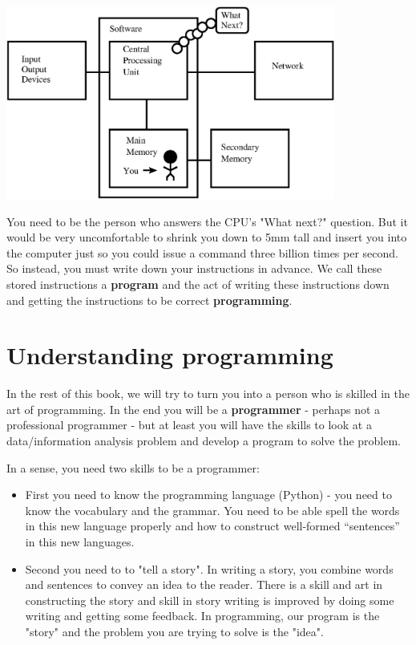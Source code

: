 \documentclass[10pt]{book}
\begin{document}
\beforefig
\centerline{\includegraphics[height=2.50in]{figs2/arch2.eps}}
\afterfig

You need to be the person who answers the CPU's "What next?" 
question.  But it would be very uncomfortable to shrink you 
down to 5mm tall and insert you into the computer just so you 
could issue a command three billion times per second.  So instead,
you must write down your instructions in advance.
We call these stored instructions a {\bf program} and the act 
of writing these instructions down and getting the instructions to 
be correct {\bf programming}.

\section{Understanding programming}

In the rest of this book, we will try to turn you into a person
who is skilled in the art of programming.  In the end you will be a 
{\bf programmer} - perhaps not a professional programmer - but 
at least you will have the skills to look at a data/information
analysis problem and develop a program to solve the problem.


In a sense, you need two skills to be a programmer:

\begin{itemize}

\item First you need to know the programming language (Python) -
you need to know the vocabulary and the grammar.  You need to be able 
spell the words in this new language properly and how to construct 
well-formed ``sentences'' in this new languages.

\item Second you need to to "tell a story".  In writing a story,
you combine words and sentences to convey an idea to the reader. 
There is a skill and art in constructing the story and skill in
story writing is improved by doing some writing and getting some
feedback.  In programming, our program is the "story" and the 
problem you are trying to solve is the "idea".

\end{itemize}
\end{document}
